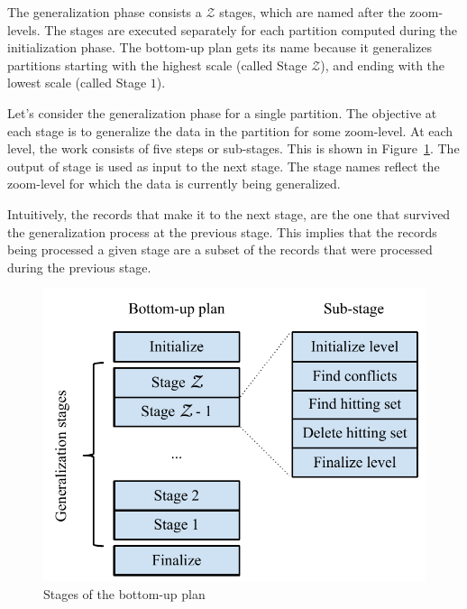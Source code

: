 The generalization phase consists a $\mathcal{Z}$ stages, which are named after the zoom-levels. The stages are executed separately for each partition computed during the initialization phase. The bottom-up plan gets its name because it generalizes partitions starting with the highest scale (called Stage $\mathcal{Z}$), and ending with the lowest scale (called Stage $1$).

Let's consider the generalization phase for a single partition. The objective at each stage is to generalize the data in the partition for some zoom-level. At each level, the work consists of five steps or sub-stages. This is shown in Figure~\ref{fig:stages}. The output of stage is used as input to the next stage.  The stage names reflect the zoom-level for which the data is currently being generalized.

Intuitively, the records that make it to the next stage, are the one that survived the generalization process at the previous stage. This implies that the records being processed a given stage are a subset of the records that were processed during the previous stage.

\begin{figure}[htbp]
\begin{center}
\includegraphics[scale=.75]{figs/cvl_stages.pdf}
\caption{Stages of the bottom-up plan}
\label{fig:stages}
\end{center}
\end{figure}
